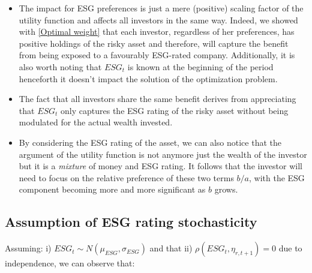 \documentclass[12pt]{article}
\begin{document}
	\begin{itemize}
		\item The impact for ESG preferences is just a mere (positive) scaling factor of the utility function and affects all investors in the same way. Indeed, we showed with \ref{Optimal weight} that each investor, regardless of her preferences, has positive holdings of the risky asset and therefore, will capture the benefit from being exposed to a favourably ESG-rated company. Additionally, it is also worth noting that $ESG_t$ is known at the beginning of the period  henceforth it doesn't impact the solution of the optimization problem.   
		\item The fact that all investors share the same benefit derives from appreciating that $ESG_t$ only captures the ESG rating of the risky asset without being modulated for the actual wealth invested.
		\item By considering the ESG rating of the asset, we can also notice that the argument of the utility function is not anymore just the wealth of the investor but it is a \textit{mixture} of money and ESG rating. It follows that the investor will need to focus on the relative preference of these two terms $b/a$, with the ESG component becoming more and more significant as $b$ grows. \vspace{-1em} 
	\end{itemize}
	
	\subsection{Assumption of ESG rating stochasticity}
	
	Assuming: i) $ESG_t \sim N(\mu_{ESG},\sigma_{ESG})$ and that ii) $\rho(ESG_t,\eta_{r, t+1}) = 0 $ due to independence, we can observe that:
	
\end{document}

